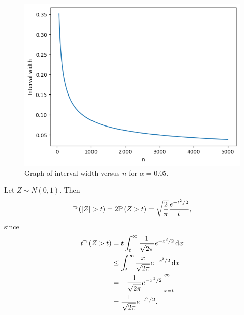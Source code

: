 \begin{ex}
\begin{enumerate}[(a)]
          \begin{figure}[H]
            \centering
            \includegraphics[scale=0.9]{../images/04-04c}
            \caption{Graph of interval width versus $n$ for $\alpha=0.05$.}
          \end{figure}
  \end{enumerate}
\end{ex}

\begin{ex}
  Let $Z\sim N(0, 1)$. Then
  \[
    \P{|Z|>t}
    =2\P{Z>t}
    =\sqrt{\frac{2}{\pi}}\frac{e^{-t^2/2}}{t},
  \]
  since
  \begin{align*}
    t\mathbb{P}\left(Z>t\right)
     & =t\int_t^\infty \frac{1}{\sqrt{2\pi}}e^{-x^2/2}\,\mathrm{d}{x}    \\
     & \leq \int_t^\infty \frac{x}{\sqrt{2\pi}}e^{-x^2/2}\,\mathrm{d}{x} \\
     & =-\frac{1}{\sqrt{2\pi}}e^{-x^2/2}\bigg\rvert_{x=t}^\infty \\
     & =\frac{1}{\sqrt{2\pi}}e^{-t^2/2}.
  \end{align*}
\end{ex}

